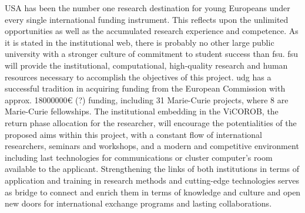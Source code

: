 USA has been the number one research destination for young Europeans under every single international funding instrument. 
This reflects upon the unlimited opportunities as well as the accumulated research experience and competence.
As it is stated in the institutional web, there is probably no other large public university with a stronger culture of commitment to student success than \ac{fsu}.
\ac{fsu} will provide the institutional, computational, high-quality research and human resources necessary to accomplish the objectives of this project.
\ac{udg} has a successful tradition in acquiring funding from the European Commission with approx. 18000000€ (?) funding, including 31 Marie-Curie projects, where 8 are Marie-Curie fellowships.
The institutional embedding in the ViCOROB, the return phase allocation for the researcher, will encourage the potentialities of the proposed aims within this project, with a constant flow of international researchers, seminars and workshops, and a modern and competitive environment including last technologies for communications or cluster computer's room available to the applicant.
Strengthening the links of both institutions in terms of application and training in research methods and cutting-edge technologies serves as bridge to connect and enrich them in terms of knowledge and culture and open new doors for international exchange programs and lasting collaborations.

\newpage

